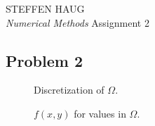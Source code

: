 \documentclass[12pt]{article}
\begin{document}
\begin{titlepage}
    \pagecolor{Themecolor}
    \afterpage{
        \nopagecolor
        \restoregeometry
    }
    \begin{center}
        {\large{}STEFFEN HAUG}\\[2em]
        {\Huge\it Numerical Methods}
        \vfill
        {\ttfamily Assignment 2}
    \end{center}
\end{titlepage}

\begin{multicols}{2}


    \section*{Problem 2}

    \begin{figure}[H]
        \centering
        
        \caption{
            Discretization of $\Omega$.
        }
    \end{figure}


    \begin{figure}[H]
        \centering
        
        \caption{
            $f(x, y)$ for values in $\Omega$.
        }
    \end{figure}
    \noindent

\end{multicols}
\end{document}
